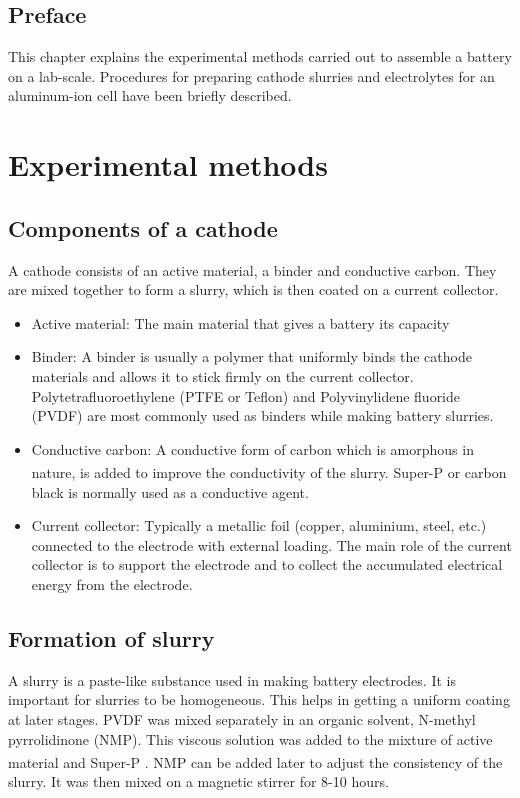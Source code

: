\section*{Preface}
This chapter explains the experimental methods carried out to assemble a battery on a lab-scale. Procedures for preparing cathode slurries and electrolytes for an aluminum-ion cell have been briefly described. 
\pagebreak
\chapter{Experimental methods} %

\label{chap3} %

\section{Components of a cathode}
A cathode consists of an active material, a binder and conductive carbon. They are mixed together to form a slurry, which is then coated on a current collector.  
\begin{itemize}
    \item Active material: The main material that gives a battery its capacity
    \item Binder: A binder is usually a polymer that uniformly binds the cathode materials and allows it to stick firmly on the current collector. Polytetrafluoroethylene (PTFE or Teflon) and Polyvinylidene fluoride (PVDF) are most commonly used as binders while making battery slurries.
    \item Conductive carbon: A conductive form of carbon which is amorphous in nature, is added to improve the conductivity of the slurry. Super-P\textsuperscript{\textregistered} or carbon black is normally used as a conductive agent. 
    \item Current collector: Typically a metallic foil (copper, aluminium, steel, etc.) connected to the electrode with external loading. The main role of the current collector is to support the electrode and to collect the accumulated electrical energy from the electrode\cite{sun_effect_2017}.
\end{itemize}

\section{Formation of slurry}
A slurry is a paste-like substance used in making battery electrodes. It is important for slurries to be homogeneous. This helps in getting a uniform coating at later stages.  PVDF was mixed separately in an organic solvent, N-methyl pyrrolidinone (NMP). This viscous solution was added to the mixture of active material and Super-P\textsuperscript{\textregistered} . NMP can be added later to adjust the consistency of the slurry. It was then mixed on a magnetic stirrer for 8-10 hours. 

